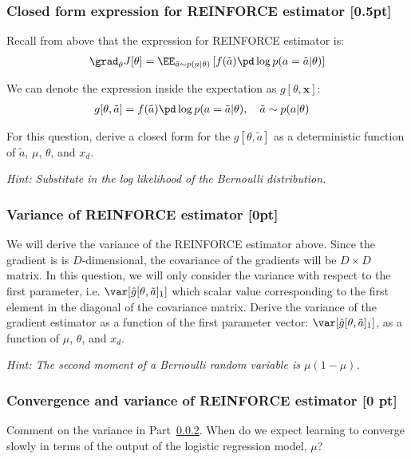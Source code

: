 \subsubsection{Closed form expression for REINFORCE estimator \color{blue}  [0.5pt]}
Recall from above that the expression for REINFORCE estimator is:
\begin{align}
    \grad_\theta J[\theta] = \EE_{\tilde{a} \sim p(a | \theta)}\left[ f(\tilde{a})  \pd \log p(a = \tilde{a}|\theta) \right]
\end{align}
    
We can denote the expression inside the expectation as  $g[\theta, \mathbf{x}]$:
\begin{align}
    g[\theta, \tilde{a}] &= f(\tilde{a})  \pd \log p(a = \tilde{a}|\theta), \quad \tilde{a} \sim p(a | \theta)
\end{align}

For this question, derive a closed form for the $g[\theta, \tilde{a}]$ as a deterministic function of $\tilde{a}$, $\mu$, $\theta$, and $x_d$. 

\textit{Hint: Substitute in the log likelihood of the Bernoulli distribution.} \\


\subsubsection{Variance of REINFORCE estimator \color{black}  [0pt]}
\label{sec:var_reinforce}
We will derive the variance of the REINFORCE estimator above. Since the gradient is is $D$-dimensional, the covariance of the gradients will be $D \times D$ matrix. In this question, we will only consider the variance with respect to the first parameter, i.e. $\var[\hat{g}[\theta, \tilde{a}]_1]$ which scalar value corresponding to the first element in the diagonal of the covariance matrix.
Derive the variance of the gradient estimator as a function of the first parameter vector: $\var[\hat{g}[\theta, \tilde{a}]_1]$, as a function of $\mu$, $\theta$, and $x_d$.

\textit{Hint: The second moment of a Bernoulli random variable is $\mu(1-\mu)$.} \\


\subsubsection{Convergence and variance of REINFORCE estimator [0 pt]}
Comment on the variance in Part~\ref{sec:var_reinforce}. When do we expect learning to converge slowly in terms of the output of the logistic regression model, $\mu$? 